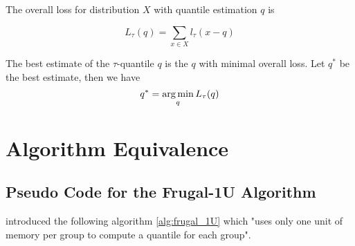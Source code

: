 The overall loss for distribution $X$ with quantile estimation $q$ is

\begin{equation}
    L_{\tau}(q) = \sum_{x \in X} l_{\tau}(x - q)
\end{equation}


The best estimate of the $\tau$-quantile $q$ is the $q$ with minimal overall loss. 
Let $q^\ast$ be the best estimate, then we have
\begin{equation}
    q^\ast = \operatorname*{arg\,min}_{q} L_{\tau}(q)
\end{equation}



\section{Algorithm Equivalence}

\subsection{Pseudo Code for the Frugal-1U Algorithm}

\citeauthor{maFrugalStreamingEstimating2014}\cite{maFrugalStreamingEstimating2014}
introduced the following algorithm \ref{alg:frugal_1U} which 
"uses only one unit of memory per group to compute a quantile for each group"\cite{maFrugalStreamingEstimating2014}.

